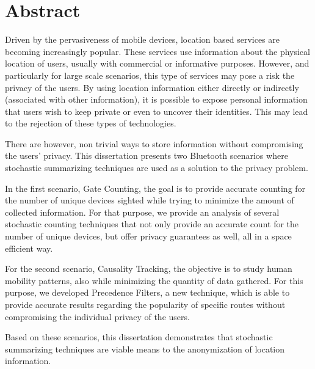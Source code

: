 \chapter*{Abstract}

Driven by the pervasiveness of mobile devices, location based services
are becoming increasingly popular. These services use
information about the physical location of users, usually with
commercial or informative purposes.  However, and particularly for
large scale scenarios, this type of services may pose a risk the
privacy of the users. By using location information either
directly or indirectly (associated with other information), it is
possible to expose personal information that users wish to
keep private or even to uncover their identities. This may lead to
the rejection of these types of technologies.

There are however, non trivial ways to store information without
compromising the users' privacy.  This dissertation presents two
Bluetooth scenarios where stochastic summarizing techniques are used
as a solution to the privacy problem.

In the first scenario, Gate Counting, the goal is to provide accurate
counting for the number of unique devices sighted while trying to
minimize the amount of collected information. For that purpose,
we provide an analysis of several stochastic counting techniques that
not only provide an accurate count for the number of unique devices,
but offer privacy guarantees as well, all in a space efficient way.

For the second scenario, Causality Tracking, the objective is to study
human mobility patterns, also while minimizing the quantity of data
gathered.  For this purpose, we developed Precedence Filters, a new
technique, which is able to provide accurate results regarding the
popularity of specific routes without compromising the individual
privacy of the users.

Based on these scenarios, this dissertation demonstrates that
stochastic summarizing techniques are viable means to the
anonymization of location information.


